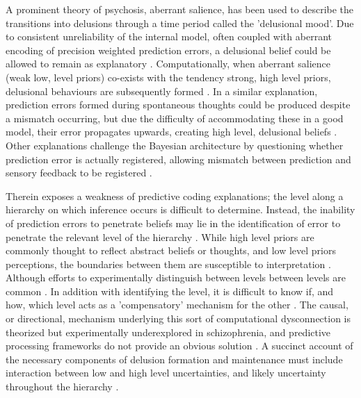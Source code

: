 \documentclass{article}
\begin{document}
A prominent theory of psychosis, aberrant salience, has been used to describe the transitions into delusions through a time period called the 'delusional mood'. Due to consistent unreliability of the internal model, often coupled with aberrant encoding of precision weighted prediction errors, a delusional belief could be allowed to remain as explanatory \citep{kapur2003psychosis}. Computationally, when aberrant salience (weak low, level priors) co-exists with the tendency  strong, high level priors, delusional behaviours are subsequently formed \citep{adams2022everything}. In a similar explanation, prediction errors formed during spontaneous thoughts could be produced despite a mismatch occurring, but due the difficulty of accommodating these in a good model, their error propagates upwards, creating high level, delusional beliefs \citep{fletcher2009perceiving}. Other explanations challenge the Bayesian architecture by questioning whether prediction error is actually registered, allowing mismatch between prediction and sensory feedback to be registered \citep{parrot2021delusional}. 

Therein exposes a weakness of predictive coding explanations; the level along a hierarchy on which inference occurs is difficult to determine. 
Instead, the inability of prediction errors to penetrate beliefs may lie in the identification of error to penetrate the relevant level of the hierarchy \citep{howhy2013predictive}. While high level priors are commonly thought to reflect abstract beliefs or thoughts, and low level priors perceptions, the boundaries between them are susceptible to interpretation \citep{goodwin2025predictive}. Although efforts to experimentally distinguish between levels between levels are common \citep{schmack2013delusions}. 
In addition with identifying the level, it is difficult to know if, and how, which level acts as a 'compensatory' mechanism for the other \citep{petrovic2023resolving}. The causal, or directional, mechanism underlying this sort of computational dysconnection is theorized but experimentally underexplored in schizophrenia, and predictive processing frameworks do not provide an obvious solution \citep{jardri2013circular, friston2016dysconnection, adams2022everything}. A succinct account of the necessary components of delusion formation and maintenance must include interaction between low and high level uncertainties, and likely uncertainty throughout the hierarchy \citep{broyd2017dopamine}.
\end{document}
